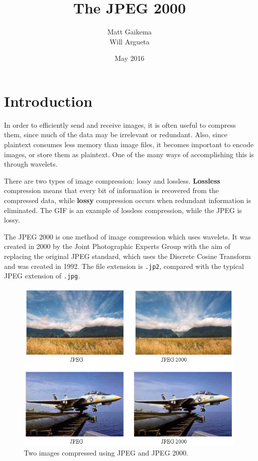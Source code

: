 \documentclass[titlepage,12pt]{article}
\title{The JPEG 2000}
\author{Matt Gaikema \\ Will Argueta}
\date{May 2016}
\begin{document}
\maketitle

\section{Introduction}

In order to efficiently send and receive images, it is often useful to compress them, 
since much of the data may be irrelevant or redundant.
Also, since plaintext consumes less memory than image files, it becomes important to encode images,
or store them as plaintext.
One of the many ways of accomplishing this is through wavelets.

There are two types of image compression: lossy and lossless.
\textbf{Lossless} compression means that every bit of information is recovered from the compressed data,
while \textbf{lossy} compression occurs when redundant information is eliminated.
The GIF is an example of lossless compression, while the JPEG is lossy.

The JPEG 2000 is one method of image compression which uses wavelets.
It was created in 2000 by the Joint Photographic Experts Group with the aim of replacing the original JPEG standard, 
which uses the Discrete Cosine Transform and was created in 1992.
The file extension is \verb|.jp2|, compared with the typical JPEG extension of \verb|.jpg|.

\begin{figure}[h]
	\centering
	\includegraphics[scale=0.4]{resources/comparison.png}
	\caption{Two images compressed using JPEG and JPEG 2000.\cite{comparison}}
	\label{fig:compare}
\end{figure}
\end{document}
